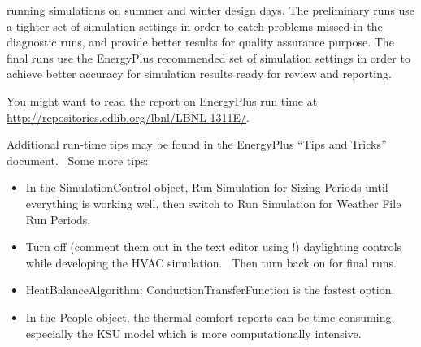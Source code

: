 running simulations on summer and winter design days. The preliminary runs use a tighter set of simulation settings in order to catch problems missed in the diagnostic runs, and provide better results for quality assurance purpose. The final runs use the EnergyPlus recommended set of simulation settings in order to achieve better accuracy for simulation results ready for review and reporting.

You might want to read the report on EnergyPlus run time at \url{http://repositories.cdlib.org/lbnl/LBNL-1311E/}.

Additional run-time tips may be found in the EnergyPlus ``Tips and Tricks'' document.~ Some more tips:

\begin{itemize}
\item
  In the \hyperref[simulationcontrol]{SimulationControl} object, Run Simulation for Sizing Periods until everything is working well, then switch to Run Simulation for Weather File Run Periods.
\item
  Turn off (comment them out in the text editor using !) daylighting controls while developing the HVAC simulation.~ Then turn back on for final runs.
\item
  HeatBalanceAlgorithm: ConductionTransferFunction is the fastest option.
\item
  In the People object, the thermal comfort reports can be time consuming, especially the KSU model which is more computationally intensive.
\end{itemize}